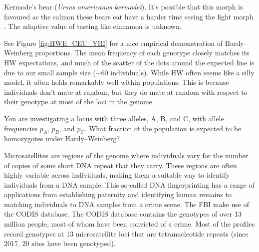 {{\begin{marginfigure}
\begin{center}
\end{center}
\caption{Kermode's bear (\textit{Ursus americanus kermodei}). It's
  possible that this morph is favoured as the salmon these bears eat have a harder time
  seeing the light morph \citep{klinka2009adaptive}. The adaptive
  value of tasting like cinnamon is unknown.  } \label{fig:Kermodes_bear}
\end{marginfigure}



See Figure \ref{fig:HWE_CEU_YRI} for a nice
empirical demonstration of Hardy--Weinberg proportions. The mean
frequency of each genotype
closely matches its HW expectations, and much of the scatter of the
dots around the expected line is due to our small sample size ($\sim
60$ individuals). While HW often
seems like a silly model, it often holds remarkably well within
populations. This is because individuals don't mate at random, but they
do mate at random with respect to their genotype at most of the loci
in the genome.

\begin{question}{}
You are investigating a locus with three alleles, A, B, and C, with
allele frequencies $p_A$, $p_B$, and $p_C$. What fraction of the
population is expected to be homozygotes under Hardy--Weinberg?
\end{question}

Microsatellites are regions of the genome where individuals vary for
the number of copies of some short DNA repeat that they carry. These
regions are often highly variable across individuals, making them
a suitable way to identify individuals from a DNA sample. This
so-called DNA fingerprinting has a range of applications from
establishing paternity and identifying human remains to matching
individuals to DNA samples from a crime scene. The FBI make use of the
CODIS database. The CODIS
database contains the genotypes of over 13 million people, most of
whom have been convicted of a crime. Most of
the profiles record genotypes at 13 microsatellite loci that are
tetranucleotide repeats (since 2017, 20 sites have been genotyped).

}}
